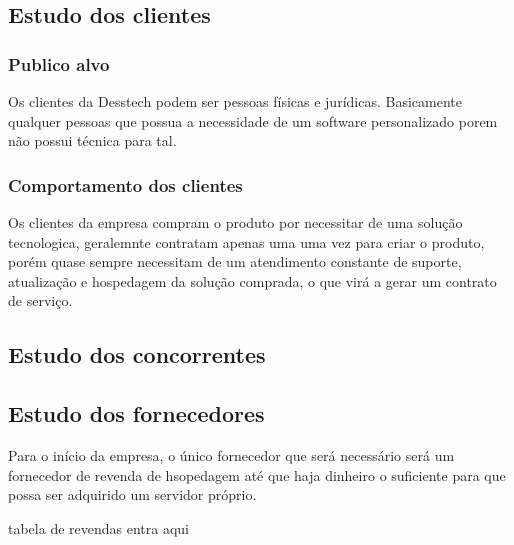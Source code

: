 \subsection{Estudo dos clientes}

	\subsubsection{Publico alvo}
		Os clientes da Desstech podem ser pessoas físicas e jurídicas. Basicamente qualquer pessoas que possua a necessidade de um software personalizado porem não possui técnica para tal.

	\subsubsection{Comportamento dos clientes}
		
		Os clientes da empresa compram o produto por necessitar de uma solução tecnologica, geralemnte contratam apenas uma uma vez para criar o produto, porém quase sempre necessitam de um atendimento constante de suporte, atualização e hospedagem da solução comprada, o que virá a gerar um contrato de serviço.

\subsection{Estudo dos concorrentes}

\subsection{Estudo dos fornecedores}
	
	Para o início da empresa, o único fornecedor que será necessário será um fornecedor de revenda de hsopedagem até que haja dinheiro o suficiente para que possa ser adquirido um servidor próprio.

	tabela de revendas entra aqui